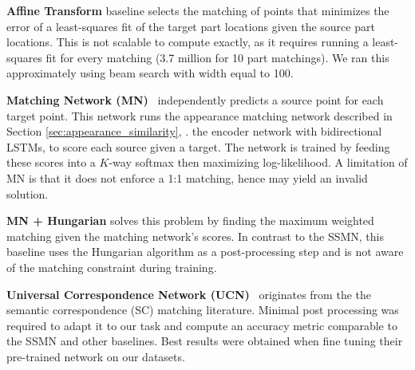 \documentclass[10pt,twocolumn,letterpaper]{article}
\begin{document}
\noindent\textbf{Affine Transform} baseline selects the matching of points that minimizes the error of a least-squares fit of the target part locations given the source part locations. This is not scalable to compute exactly, as it requires running a least-squares fit for every matching (3.7 million for 10 part matchings). We ran this approximately using beam search with width equal to 100.

\noindent\textbf{Matching Network (MN)}~\cite{vinyalsBLKW16} independently predicts a source point for each target point. This network runs the appearance matching network described in Section \ref{sec:appearance_similarity}, \ie. the encoder network with bidirectional LSTMs, to score each source given a target. The network is trained by feeding these scores into a $K$-way softmax then maximizing log-likelihood. A limitation of MN is that it does not enforce a 1:1 matching, hence may yield an invalid solution.

\noindent\textbf{MN + Hungarian} solves this problem by finding the maximum weighted matching given the matching network's scores. In contrast to the SSMN, this baseline uses the Hungarian algorithm as a post-processing step and is not aware of the matching constraint during training.


\noindent\textbf{Universal Correspondence Network (UCN)}~\cite{Choy2016UniversalCN} originates from the the semantic correspondence (SC) matching literature. 
Minimal post processing was required to adapt it to our task and compute an accuracy metric comparable to the SSMN and other baselines. 
Best results were obtained when fine tuning their pre-trained network on our datasets.
\end{document}
